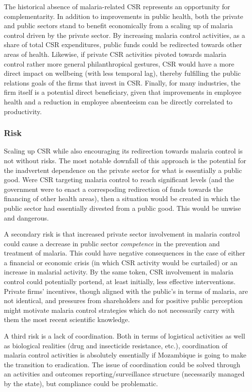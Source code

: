 \documentclass[]{elsarticle} %
\begin{document}
The historical absence of malaria-related CSR represents an opportunity
for complementarity. In addition to improvements in public health, both
the private and public sectors stand to benefit economically from a
scaling up of malaria control driven by the private sector. By
increasing malaria control activities, as a share of total CSR
expenditures, public funds could be redirected towards other areas of
health. Likewise, if private CSR activities pivoted towards malaria
control rather more general philanthropical gestures, CSR would have a
more direct impact on wellbeing (with less temporal lag), thereby
fulfilling the public relations goals of the firms that invest in CSR.
Finally, for many industries, the firm itself is a potential direct
beneficiary, given that improvements in employee health and a reduction
in employee absenteeism can be directly correlated to productivity.

\subsubsection{Risk}\label{risk}

Scaling up CSR while also encouraging its redirection towards malaria
control is not without risks. The most notable downfall of this approach
is the potential for the inadvertent dependence on the private sector
for what is essentially a public good. Were CSR targeting malaria
control to reach significant levels (and the government were to enact a
correspoding redirection of funds towards the financing of other health
areas), then a situation would be created in which the public sector had
essentially divested from a public good. This would be unwise and
dangerous.

A secondary risk is that increased private sector involvement in malaria
control could cause a decrease in public sector \emph{competence} in the
prevention and treatment of malaria. This could have negative
consequences in the case of either a financial or economic crisis (in
which CSR activity would be curtailed) or an increase in malarial
activity. By the same token, CSR involvement in malaria control could
potentially portend, at least initially, less effective interventions.
Private firms' incentives, though aligned with the public's in terms of
malaria, are not identical, and pressures from shareholders and for
positive public perception might motivate malaria control strategies
which do not necessarily carry with them the most recent scientific
knowledge.

A third risk is a lack of coordination. Both in terms of logistical
activities as well as biological realities (drug and insecticide
resistance, etc.), coordination of malaria control activities is
absolutely essentially if Mozambique is going to make the transition to
eradication. The issue of coordination could be solved through an
activities and outcomes reporting/surveillance structure (necessarily
managed by the state), but compliance could be problematic.
\end{document}
